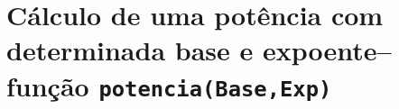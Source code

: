 

\section{Cálculo de uma potência com determinada base e expoente--função
	\texttt{potencia(Base,Exp)}}
\label{appendix:d:sec:d6}



